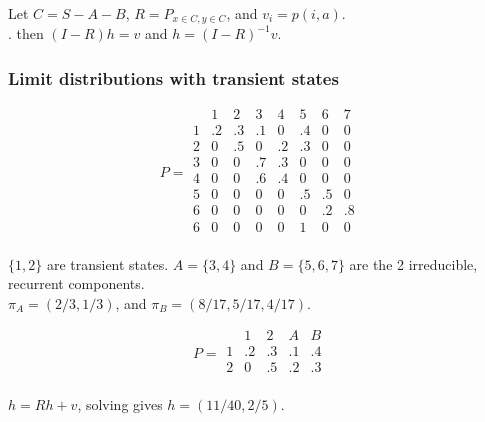 \documentclass{article}
\begin{document}
Let $C = S-A-B$, $R = P_{x \in C, y \in C}$, and $v_i = p(i, a)$. \\

. then $(I-R) h = v$ and $h = (I-R)^{-1} v$.


\subsubsection{Limit distributions with transient states}
\noindent
\begin{minipage}[t]{0.5\textwidth}
$$P = \begin{array}{c|cc|cc|ccc}
& 1 & 2 & 3 & 4 & 5 & 6 & 7 \\
\hline
1 & .2 & .3 & .1 & 0 & .4 & 0 & 0 \\
2 & 0 & .5 & 0 & .2 & .3 & 0 & 0 \\
\hline
3 & 0 & 0 & .7 & .3 & 0 & 0 & 0 \\
4 & 0 & 0 & .6 & .4 & 0 & 0 & 0 \\
\hline
5 & 0 & 0 & 0 & 0 & .5 & .5 & 0 \\
6 & 0 & 0 & 0 & 0 & 0 & .2 & .8 \\
6 & 0 & 0 & 0 & 0 & 1 & 0 & 0 \\
\end{array}$$

$\{1, 2\}$ are transient states. $A = \{3, 4\}$ and $B = \{5, 6, 7\}$ are the 2 irreducible, recurrent components. \\

$\pi_A = (2/3, 1/3)$, and $\pi_B = (8/17, 5/17, 4/17)$.
\end{minipage}
\hspace{3em}
\begin{minipage}[t]{0.5\textwidth}
$$P=\begin{array}{c|cc|cc}
& 1 & 2 & A & B \\
\hline
1 & .2 & .3 & .1 &.4 \\
2 & 0 & .5 & .2 & .3 \\
\end{array}$$

$h = R h + v$, solving gives $h = (11/40, 2/5)$.
\end{minipage} \\ \\ \\ \\
\end{document}
